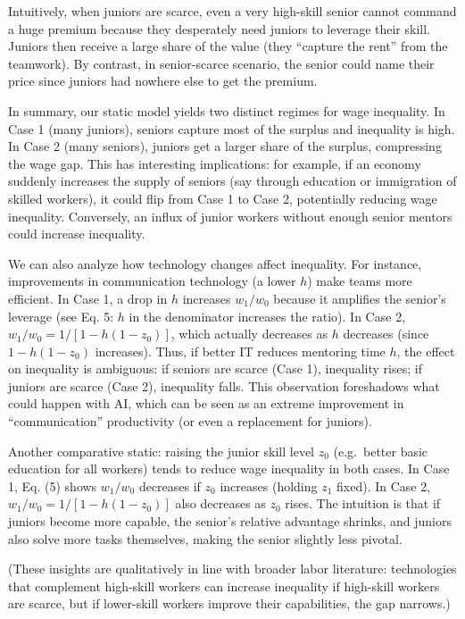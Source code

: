 \documentclass[12pt]{article}
\begin{document}
Intuitively, when juniors are scarce, even a very high-skill senior
cannot command a huge premium because they desperately need juniors to
leverage their skill. Juniors then receive a large share of the value
(they ``capture the rent'' from the teamwork). By contrast, in
senior-scarce scenario, the senior could name their price since
juniors had nowhere else to get the premium.

In summary, our static model yields two distinct regimes for wage
inequality. {In Case 1 (many juniors), seniors capture most of
the surplus and inequality is high}. {In Case 2 (many seniors),
juniors get a larger share of the surplus, compressing the wage gap.}
This has interesting implications: for example, if an economy suddenly
increases the supply of seniors (say through education or immigration of
skilled workers), it could flip from Case 1 to Case 2, potentially
{reducing wage inequality}. Conversely, an influx of junior workers
without enough senior mentors could increase inequality.

We can also analyze how {technology changes} affect inequality.
For instance, improvements in communication technology (a lower \(h\))
make teams more efficient. In Case 1, a drop in \(h\) {increases}
\(w_1/w_0\) because it amplifies the senior's leverage (see Eq. 5: \(h\)
in the denominator increases the ratio). In Case 2,
\(w_1/w_0 = 1/[1-h(1-z_0)]\), which actually {decreases} as \(h\)
decreases (since \(1 - h(1-z_0)\) increases). Thus, if better IT reduces
mentoring time \(h\), the effect on inequality is ambiguous: {if
seniors are scarce (Case 1), inequality rises; if juniors are scarce
(Case 2), inequality falls.} This observation foreshadows what could
happen with AI, which can be seen as an extreme improvement in
``communication'' productivity (or even a replacement for juniors).

Another comparative static: raising the junior skill level \(z_0\)
(e.g.~better basic education for all workers) tends to {reduce
wage inequality} in both cases. In Case 1, Eq. (5) shows \(w_1/w_0\)
decreases if \(z_0\) increases (holding \(z_1\) fixed). In Case 2,
\(w_1/w_0 = 1/[1-h(1-z_0)]\) also decreases as \(z_0\) rises. The
intuition is that if juniors become more capable, the senior's relative
advantage shrinks, and juniors also solve more tasks themselves, making
the senior slightly less pivotal.

{(These insights are qualitatively in line with broader labor
literature: technologies that complement high-skill workers can increase
inequality if high-skill workers are scarce, but if lower-skill workers
improve their capabilities, the gap narrows.)}
\end{document}
